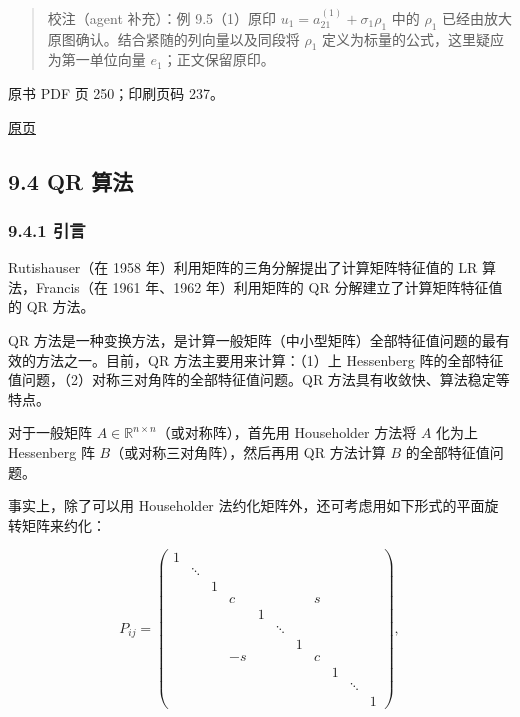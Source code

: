 \begin{quote}
校注（agent 补充）：例 9.5（1）原印 \(u_1=a_{21}^{(1)}+\sigma_1\rho_1\) 中的 \(\rho_1\) 已经由放大原图确认。结合紧随的列向量以及同段将 \(\rho_1\) 定义为标量的公式，这里疑应为第一单位向量 \(e_1\)；正文保留原印。
\end{quote}

\clearpage

原书 PDF 页 250；印刷页码 237。

\href{source-images/pdf-250.jpeg}{原页}

\subsection{9.4 QR 算法}\label{ch09b-qr-ux7b97ux6cd5}

\subsubsection{9.4.1 引言}\label{ch09b-ux5f15ux8a00}

Rutishauser（在 1958 年）利用矩阵的三角分解提出了计算矩阵特征值的 LR 算法，Francis（在 1961 年、1962 年）利用矩阵的 QR 分解建立了计算矩阵特征值的 QR 方法。

QR 方法是一种变换方法，是计算一般矩阵（中小型矩阵）全部特征值问题的最有效的方法之一。目前，QR 方法主要用来计算：（1）上 Hessenberg 阵的全部特征值问题，（2）对称三对角阵的全部特征值问题。QR 方法具有收敛快、算法稳定等特点。

对于一般矩阵 \(A\in\mathbb R^{n\times n}\)（或对称阵），首先用 Householder 方法将 \(A\) 化为上 Hessenberg 阵 \(B\)（或对称三对角阵），然后再用 QR 方法计算 \(B\) 的全部特征值问题。

事实上，除了可以用 Householder 法约化矩阵外，还可考虑用如下形式的平面旋转矩阵来约化：

\[
P_{ij}=\left(\begin{array}{*{11}{c}}
1&&&&&&&&&&\\
&\ddots&&&&&&&&&\\
&&1&&&&&&&&\\
&&&c&&&&s&&&\\
&&&&1&&&&&&\\
&&&&&\ddots&&&&&\\
&&&&&&1&&&&\\
&&&-s&&&&c&&&\\
&&&&&&&&1&&\\
&&&&&&&&&\ddots&\\
&&&&&&&&&&1
\end{array}\right),
\tag{9.4.1}
\]

